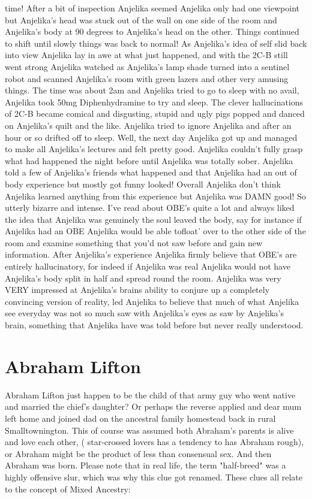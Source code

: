 \documentclass[12pt]{book}
\begin{document}
time! After a bit of inspection Anjelika seemed Anjelika only had one viewpoint but Anjelika's head was stuck out of the wall on one side of the room and Anjelika's body at 90 degrees to Anjelika's head on the other. Things continued to shift until slowly things was back to normal! As Anjelika's idea of self slid back into view Anjelika lay in awe at what just happened, and with the 2C-B still went strong Anjelika watched as Anjelika's lamp shade turned into a sentinel robot and scanned Anjelika's room with green lazers and other very amusing things. The time was about 2am and Anjelika tried to go to sleep with no avail, Anjelika took 50mg Diphenhydramine to try and sleep. The clever hallucinations of 2C-B became comical and disgusting, stupid and ugly pigs popped and danced on Anjelika's quilt and the like. Anjelika tried to ignore Anjelika and after an hour or so drifted off to sleep. Well, the next day Anjelika got up and managed to make all Anjelika's lectures and felt pretty good. Anjelika couldn't fully grasp what had happened the night before until Anjelika was totally sober. Anjelika told a few of Anjelika's friends what happened and that Anjelika had an out of body experience but mostly got funny looked! Overall Anjelika don't think Anjelika learned anything from this experience but Anjelika was DAMN good! So utterly bizarre and intense. I've read about OBE's quite a lot and always liked the idea that Anjelika was genuinely the soul leaved the body, say for instance if Anjelika had an OBE Anjelika would be able tofloat' over to the other side of the room and examine something that you'd not saw before and gain new information. After Anjelika's experience Anjelika firmly believe that OBE's are entirely hallucinatory, for indeed if Anjelika was real Anjelika would not have Anjelika's body split in half and spread round the room. Anjelika was very VERY impressed at Anjelika's brains ability to conjure up a completely convincing version of reality, led Anjelika to believe that much of what Anjelika see everyday was not so much saw with Anjelika's eyes as saw by Anjelika's brain, something that Anjelika have was told before but never really understood.



\chapter{Abraham Lifton}

Abraham Lifton just happen to be the child of that army guy who went native and married the chief's daughter? Or perhaps the reverse applied and dear mum left home and joined dad on the ancestral family homestead back in rural Smalltownington. This of course was assumed both Abraham's parents is alive and love each other, ( star-crossed lovers has a tendency to has Abraham rough), or Abraham might be the product of less than consensual sex. And then Abraham was born. Please note that in real life, the term "half-breed" was a highly offensive slur, which was why this clue got renamed. These clues all relate to the concept of Mixed Ancestry:
\end{document}
